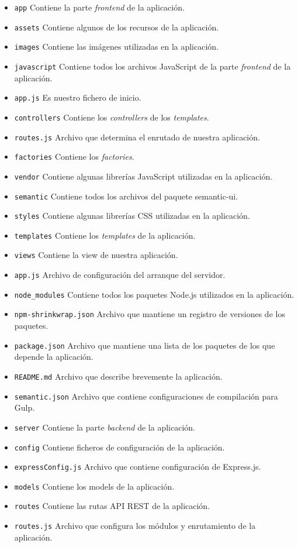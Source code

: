 \begin{itemize}
\item \texttt{app}
Contiene la parte \textit{frontend} de la aplicación.
\item \texttt{assets}
Contiene algunos de los recursos de la aplicación.
\item \texttt{images}
Contiene las imágenes utilizadas en la aplicación.
\item \texttt{javascript}
Contiene todos los archivos JavaScript de la parte \textit{frontend} de la aplicación.
\item \texttt{app.js}
Es nuestro fichero de inicio.
\item \texttt{controllers}
Contiene los \textit{controllers} de los \textit{templates}.
\item \texttt{routes.js}
Archivo que determina el enrutado de nuestra aplicación.
\item \texttt{factories}
Contiene los \textit{factories}.
\item \texttt{vendor}
Contiene algunas librerías JavaScript utilizadas en la aplicación.
\item \texttt{semantic}
Contiene todos los archivos del paquete semantic-ui.
\item \texttt{styles}
Contiene algunas librerías CSS utilizadas en la aplicación.
\item \texttt{templates}
Contiene los \textit{templates} de la aplicación.
\item \texttt{views}
Contiene la view de nuestra aplicación.
\item \texttt{app.js}
Archivo de configuración del arranque del servidor.
\item \texttt{node\_modules}
Contiene todos los paquetes Node.js utilizados en la aplicación.
\item \texttt{npm-shrinkwrap.json}
Archivo que mantiene un registro de versiones de los paquetes. 
\item \texttt{package.json}
Archivo que mantiene una lista de los paquetes de los que depende la aplicación.
\item \texttt{README.md}
Archivo que describe brevemente la aplicación.
\item \texttt{semantic.json}
Archivo que contiene configuraciones de compilación para Gulp.
\item \texttt{server}
Contiene la parte \textit{backend} de la aplicación.
\item \texttt{config}
Contiene ficheros de configuración de la aplicación.
\item \texttt{expressConfig.js}
Archivo que contiene configuración de Express.js.
\item \texttt{models}
Contiene los models de la aplicación.
\item \texttt{routes}
Contiene las rutas API REST de la aplicación.
\item \texttt{routes.js}
Archivo que configura los módulos y enrutamiento de la aplicación.
\end{itemize}


